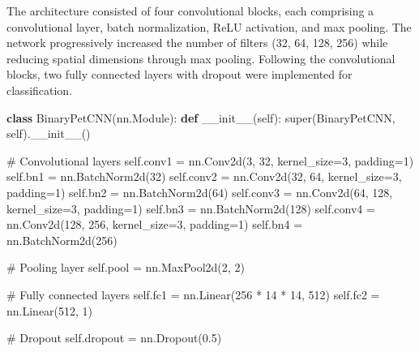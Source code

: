 \documentclass[
]{article}
\newenvironment{Shaded}{\begin{snugshade}}{\end{snugshade}}
\newcommand{\BuiltInTok}[1]{\textcolor[rgb]{0.00,0.23,0.31}{#1}}
\newcommand{\CommentTok}[1]{\textcolor[rgb]{0.37,0.37,0.37}{#1}}
\newcommand{\DecValTok}[1]{\textcolor[rgb]{0.68,0.00,0.00}{#1}}
\newcommand{\FloatTok}[1]{\textcolor[rgb]{0.68,0.00,0.00}{#1}}
\newcommand{\FunctionTok}[1]{\textcolor[rgb]{0.28,0.35,0.67}{#1}}
\newcommand{\KeywordTok}[1]{\textcolor[rgb]{0.00,0.23,0.31}{\textbf{#1}}}
\newcommand{\NormalTok}[1]{\textcolor[rgb]{0.00,0.23,0.31}{#1}}
\newcommand{\OperatorTok}[1]{\textcolor[rgb]{0.37,0.37,0.37}{#1}}
\newcommand{\VariableTok}[1]{\textcolor[rgb]{0.07,0.07,0.07}{#1}}
\begin{document}
The architecture consisted of four convolutional blocks, each comprising
a convolutional layer, batch normalization, ReLU activation, and max
pooling. The network progressively increased the number of filters (32,
64, 128, 256) while reducing spatial dimensions through max pooling.
Following the convolutional blocks, two fully connected layers with
dropout were implemented for classification.

\begin{Shaded}
\begin{Highlighting}[]
\KeywordTok{class}\NormalTok{ BinaryPetCNN(nn.Module):}
    \KeywordTok{def} \FunctionTok{\_\_init\_\_}\NormalTok{(}\VariableTok{self}\NormalTok{):}
        \BuiltInTok{super}\NormalTok{(BinaryPetCNN, }\VariableTok{self}\NormalTok{).}\FunctionTok{\_\_init\_\_}\NormalTok{()}
        
        \CommentTok{\# Convolutional layers}
        \VariableTok{self}\NormalTok{.conv1 }\OperatorTok{=}\NormalTok{ nn.Conv2d(}\DecValTok{3}\NormalTok{, }\DecValTok{32}\NormalTok{, kernel\_size}\OperatorTok{=}\DecValTok{3}\NormalTok{, padding}\OperatorTok{=}\DecValTok{1}\NormalTok{)}
        \VariableTok{self}\NormalTok{.bn1 }\OperatorTok{=}\NormalTok{ nn.BatchNorm2d(}\DecValTok{32}\NormalTok{)}
        \VariableTok{self}\NormalTok{.conv2 }\OperatorTok{=}\NormalTok{ nn.Conv2d(}\DecValTok{32}\NormalTok{, }\DecValTok{64}\NormalTok{, kernel\_size}\OperatorTok{=}\DecValTok{3}\NormalTok{, padding}\OperatorTok{=}\DecValTok{1}\NormalTok{)}
        \VariableTok{self}\NormalTok{.bn2 }\OperatorTok{=}\NormalTok{ nn.BatchNorm2d(}\DecValTok{64}\NormalTok{)}
        \VariableTok{self}\NormalTok{.conv3 }\OperatorTok{=}\NormalTok{ nn.Conv2d(}\DecValTok{64}\NormalTok{, }\DecValTok{128}\NormalTok{, kernel\_size}\OperatorTok{=}\DecValTok{3}\NormalTok{, padding}\OperatorTok{=}\DecValTok{1}\NormalTok{)}
        \VariableTok{self}\NormalTok{.bn3 }\OperatorTok{=}\NormalTok{ nn.BatchNorm2d(}\DecValTok{128}\NormalTok{)}
        \VariableTok{self}\NormalTok{.conv4 }\OperatorTok{=}\NormalTok{ nn.Conv2d(}\DecValTok{128}\NormalTok{, }\DecValTok{256}\NormalTok{, kernel\_size}\OperatorTok{=}\DecValTok{3}\NormalTok{, padding}\OperatorTok{=}\DecValTok{1}\NormalTok{)}
        \VariableTok{self}\NormalTok{.bn4 }\OperatorTok{=}\NormalTok{ nn.BatchNorm2d(}\DecValTok{256}\NormalTok{)}
        
        \CommentTok{\# Pooling layer}
        \VariableTok{self}\NormalTok{.pool }\OperatorTok{=}\NormalTok{ nn.MaxPool2d(}\DecValTok{2}\NormalTok{, }\DecValTok{2}\NormalTok{)}
        
        \CommentTok{\# Fully connected layers}
        \VariableTok{self}\NormalTok{.fc1 }\OperatorTok{=}\NormalTok{ nn.Linear(}\DecValTok{256} \OperatorTok{*} \DecValTok{14} \OperatorTok{*} \DecValTok{14}\NormalTok{, }\DecValTok{512}\NormalTok{)}
        \VariableTok{self}\NormalTok{.fc2 }\OperatorTok{=}\NormalTok{ nn.Linear(}\DecValTok{512}\NormalTok{, }\DecValTok{1}\NormalTok{)}
        
        \CommentTok{\# Dropout}
        \VariableTok{self}\NormalTok{.dropout }\OperatorTok{=}\NormalTok{ nn.Dropout(}\FloatTok{0.5}\NormalTok{)}
\end{Highlighting}
\end{Shaded}
\end{document}

